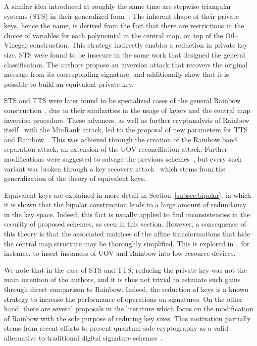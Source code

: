 \documentclass[draft, 12pt, a4paper, oneside]{memoir}
\theoremstyle{definition}
\begin{document}
A similar idea introduced at roughly the same time are stepwise triangular systems (STS) in their generalized form~\cite{Wolf:200603}. The inherent shape of their private keys, hence the name, is derived from the fact that there are restrictions in the choice of variables for each polynomial in the central map, on top of the Oil--Vinegar construction. This strategy indirectly enables a reduction in private key size. STS were found to be insecure in the same work that designed the general classification. The authors propose an inversion attack that recovers the original message from its corresponding signature, and additionally show that it is possible to build an equivalent private key.

STS and TTS were later found to be specialized cases of the general Rainbow construction~\cite{Ding:200806}, due to their similarities in the usage of layers and the central map inversion procedure. These advances, as well as further cryptanalysis of Rainbow itself~\cite{Billet:200609} with the MinRank attack, led to the proposal of new parameters for TTS and Rainbow~\cite{Ding:200806}. This was achieved through the creation of the Rainbow band separation attack, an extension of the UOV reconciliation attack. Further modifications were suggested to salvage the previous schemes~\cite{Tsujii:201005}, but every such variant was broken through a key recovery attack~\cite{Thomae:201207} which stems from the generalization of the theory of equivalent keys.

Equivalent keys are explained in more detail in Section~\ref{subsec:bipolar}, in which it is shown that the bipolar construction leads to a large amount of redundancy in the key space. Indeed, this fact is usually applied to find inconsistencies in the security of proposed schemes, as seen in this section. However, a consequence of this theory is that the associated matrices of the affine transformations that hide the central map structure may be thoroughly simplified. This is explored in~\cite{Czypek:201209}, for instance, to insert instances of UOV and Rainbow into low-resource devices.

We note that in the case of STS and TTS, reducing the private key was not the main intention of the authors, and it is thus not trivial to estimate such gains through direct comparison to Rainbow. Indeed, the reduction of keys is a known strategy to increase the performance of operations on signatures. On the other hand, there are several proposals in the literature which focus on the modification of Rainbow with the sole purpose of reducing key sizes. This motivation partially stems from recent efforts to present quantum-safe cryptography as a valid alternative to traditional digital signature schemes~\cite{Bernstein:2008}.
\end{document}
